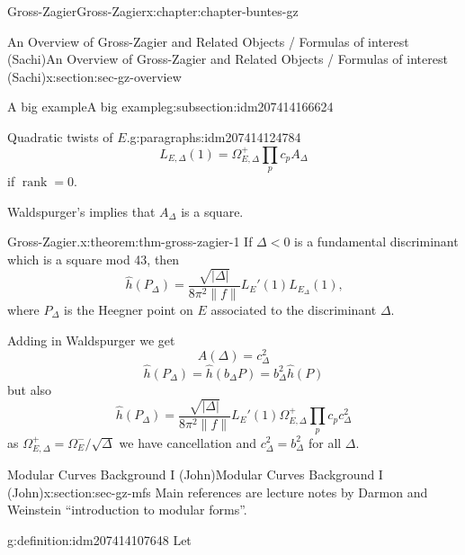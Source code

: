 \documentclass[oneside,10pt,]{book}
\numberwithin{equation}{section}
\DeclareMathOperator{\rank}{rank}
\newcommand{\lt}{<}
\begin{document}
\begin{chapterptx}{Gross-Zagier}{}{Gross-Zagier}{}{}{x:chapter:chapter-buntes-gz}
\begin{sectionptx}{An Overview of Gross-Zagier and Related Objects \slash{} Formulas of interest (Sachi)}{}{An Overview of Gross-Zagier and Related Objects \slash{} Formulas of interest (Sachi)}{}{}{x:section:sec-gz-overview}
\begin{subsectionptx}{A big example}{}{A big example}{}{}{g:subsection:idm207414166624}
\begin{paragraphs}{Quadratic twists of \(E\).}{g:paragraphs:idm207414124784}
\begin{equation*}
L_{E,\Delta } (1) = \Omega _{E,\Delta }^+  \prod_p c_p A_\Delta
\end{equation*}
if \(\rank = 0\).%
\par
Waldspurger's implies that \(A_\Delta \) is a square.%
\end{paragraphs}%
\begin{theorem}{Gross-Zagier.}{}{x:theorem:thm-gross-zagier-1}%
If \(\Delta \lt  0 \) is a fundamental discriminant which is a square mod 43, then%
\begin{equation*}
\hat h(P_\Delta ) = \frac{\sqrt{|\Delta |}}{8\pi ^2 \| f\|} L_E'(1) L_{E_\Delta }(1)\text{,}
\end{equation*}
where \(P_\Delta \) is the Heegner point on \(E\) associated to the discriminant \(\Delta \).%
\end{theorem}
Adding in Waldspurger we get%
\begin{equation*}
A(\Delta ) = c_\Delta ^2
\end{equation*}
%
\begin{equation*}
\hat h(P_\Delta )= \hat h(b_\Delta  P) = b_\Delta ^2\hat h(P)
\end{equation*}
but also%
\begin{equation*}
\hat h(P_\Delta ) = \frac{\sqrt{|\Delta |}}{8\pi ^2 \| f\|} L_E'(1) \Omega _{E,\Delta }^+ \prod_p c_p c_\Delta^2
\end{equation*}
as \(\Omega _{E,\Delta }^+ = \Omega _E^-  / \sqrt \Delta \) we have cancellation and \(c_\Delta ^2 = b_\Delta ^2\) for all \(\Delta \).%
\end{subsectionptx}
\end{sectionptx}
%
%
\typeout{************************************************}
\typeout{************************************************}
%
\begin{sectionptx}{Modular Curves Background I (John)}{}{Modular Curves Background I (John)}{}{}{x:section:sec-gz-mfs}
Main references are lecture notes by Darmon and Weinstein ``introduction to modular forms''.%
\begin{definition}{}{g:definition:idm207414107648}%
Let%
\begin{equation*}

\end{equation*}
\end{definition}
\end{sectionptx}
\end{chapterptx}
\end{document}
